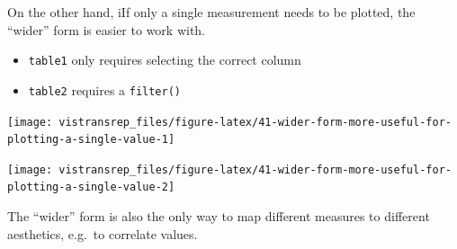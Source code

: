 \documentclass[]{book}
\newenvironment{Shaded}{}{}
\newcommand{\DataTypeTok}[1]{#1}
\newcommand{\KeywordTok}[1]{\textcolor[rgb]{0.00,0.00,1.00}{#1}}
\newcommand{\NormalTok}[1]{#1}
\newcommand{\OperatorTok}[1]{#1}
\newcommand{\StringTok}[1]{\textcolor[rgb]{0.00,0.50,0.50}{#1}}
\providecommand{\tightlist}{%
  \setlength{\itemsep}{0pt}\setlength{\parskip}{0pt}}
\begin{document}
On the other hand, iIf only a single measurement needs to be plotted, the ``wider'' form is easier to work with.

\begin{itemize}
\tightlist
\item
  \texttt{table1} only requires selecting the correct column
\item
  \texttt{table2} requires a \texttt{filter()}
\end{itemize}

\begin{Shaded}
\end{Shaded}

\begin{flushright}\texttt{[image: vistransrep\_files/figure-latex/41-wider-form-more-useful-for-plotting-a-single-value-1]} \end{flushright}

\begin{Shaded}
\end{Shaded}

\begin{flushright}\texttt{[image: vistransrep\_files/figure-latex/41-wider-form-more-useful-for-plotting-a-single-value-2]} \end{flushright}

The ``wider'' form is also the only way to map different measures to different aesthetics, e.g.~to correlate values.

\begin{Shaded}
\end{Shaded}
\end{document}
